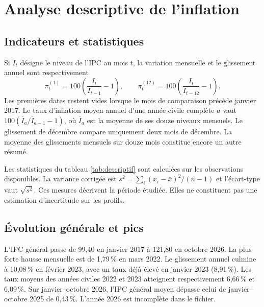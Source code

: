\chapter{Analyse descriptive de l'inflation}
\section{Indicateurs et statistiques}
Si $I_t$ désigne le niveau de l'IPC au mois $t$, la variation mensuelle et le glissement annuel sont respectivement
\[
  \pi_t^{(1)}=100\left(\frac{I_t}{I_{t-1}}-1\right),
  \qquad
  \pi_t^{(12)}=100\left(\frac{I_t}{I_{t-12}}-1\right).
\]
Les premières dates restent vides lorsque le mois de comparaison précède janvier 2017. Le taux d'inflation moyen annuel d'une année civile complète $a$ vaut $100(\overline I_a/\overline I_{a-1}-1)$, où $\overline I_a$ est la moyenne de ses douze niveaux mensuels. Le glissement de décembre compare uniquement deux mois de décembre. La moyenne des glissements mensuels sur douze mois constitue encore un autre résumé.

Les statistiques du tableau \ref{tab:descriptif} sont calculées sur les observations disponibles. La variance corrigée est $s^2=\sum_i(x_i-\bar x)^2/(n-1)$ et l'écart-type vaut $\sqrt{s^2}$. Ces mesures décrivent la période étudiée. Elles ne constituent pas une estimation d'incertitude sur les profils.



\section{Évolution générale et pics}
L'IPC général passe de 99,40 en janvier 2017 à 121,80 en octobre 2026. La plus forte hausse mensuelle est de 1,79\,\% en mars 2022. Le glissement annuel culmine à 10,08\,\% en février 2023, avec un taux déjà élevé en janvier 2023 (8,91\,\%). Les taux moyens des années civiles 2022 et 2023 atteignent respectivement 6,66\,\% et 6,09\,\%. Sur janvier--octobre 2026, l'IPC général moyen dépasse celui de janvier--octobre 2025 de 0,43\,\%. L'année 2026 est incomplète dans le fichier.

